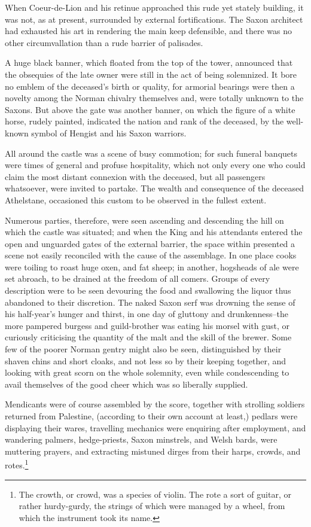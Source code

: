 When Coeur-de-Lion and his retinue approached this rude yet stately
building, it was not, as at present, surrounded by external
fortifications. The Saxon architect had exhausted his art in rendering
the main keep defensible, and there was no other circumvallation than a
rude barrier of palisades.

A huge black banner, which floated from the top of the tower, announced
that the obsequies of the late owner were still in the act of being
solemnized. It bore no emblem of the deceased's birth or quality, for
armorial bearings were then a novelty among the Norman chivalry
themselves and, were totally unknown to the Saxons. But above the gate
was another banner, on which the figure of a white horse, rudely
painted, indicated the nation and rank of the deceased, by the
well-known symbol of Hengist and his Saxon warriors.

All around the castle was a scene of busy commotion; for such funeral
banquets were times of general and profuse hospitality, which not only
every one who could claim the most distant connexion with the deceased,
but all passengers whatsoever, were invited to partake. The wealth and
consequence of the deceased Athelstane, occasioned this custom to be
observed in the fullest extent.

Numerous parties, therefore, were seen ascending and descending the hill
on which the castle was situated; and when the King and his attendants
entered the open and unguarded gates of the external barrier, the space
within presented a scene not easily reconciled with the cause of the
assemblage. In one place cooks were toiling to roast huge oxen, and fat
sheep; in another, hogsheads of ale were set abroach, to be drained at
the freedom of all comers. Groups of every description were to be seen
devouring the food and swallowing the liquor thus abandoned to their
discretion. The naked Saxon serf was drowning the sense of his
half-year's hunger and thirst, in one day of gluttony and
drunkenness--the more pampered burgess and guild-brother was eating his
morsel with gust, or curiously criticising the quantity of the malt and
the skill of the brewer. Some few of the poorer Norman gentry might also
be seen, distinguished by their shaven chins and short cloaks, and not
less so by their keeping together, and looking with great scorn on the
whole solemnity, even while condescending to avail themselves of the
good cheer which was so liberally supplied.

Mendicants were of course assembled by the score, together with
strolling soldiers returned from Palestine, (according to their own
account at least,) pedlars were displaying their wares, travelling
mechanics were enquiring after employment, and wandering palmers,
hedge-priests, Saxon minstrels, and Welsh bards, were muttering prayers,
and extracting mistuned dirges from their harps, crowds, and
rotes.\footnote{The crowth, or crowd, was a species of violin. The rote
a sort of guitar, or rather hurdy-gurdy, the strings of which were
managed by a wheel, from which the instrument took its name.}

